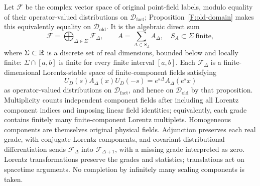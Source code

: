 \begin{assumption}
Let $\mathcal F$ be the complex vector space of original point-field
labels, modulo equality of their operator-valued distributions on
$\mathcal D_{\mathrm{fact}}$; Proposition~\ref{F:old-domain} makes this
equivalently equality on $\mathcal D_{\mathrm{old}}$. It is the algebraic direct sum
\[
 \mathcal F=\bigoplus_{\Delta\in\Sigma}\mathcal F_\Delta,
 \qquad
 A=\sum_{\Delta\in S_A}A_\Delta,
 \quad S_A\subset\Sigma\ \text{finite},
\]
where $\Sigma\subset\mathbb R$ is a discrete set of real dimensions, bounded
below and locally finite: $\Sigma\cap[a,b]$ is finite for every finite
interval $[a,b]$. Each $\mathcal F_\Delta$ is a finite-dimensional
Lorentz-stable space of finite-component fields satisfying
\[
 U_D(s)A_\Delta(x)U_D(-s)
       =e^{s\Delta}A_\Delta(e^s x)
\]
as operator-valued distributions on $\mathcal D_{\mathrm{fact}}$, and hence
on $\mathcal D_{\mathrm{old}}$ by that proposition.
Multiplicity counts independent component fields after including all
Lorentz component indices and imposing linear field identities;
equivalently, each grade contains finitely many finite-component Lorentz
multiplets. Homogeneous components are themselves original physical
fields. Adjunction preserves each real grade, with conjugate Lorentz
components, and covariant distributional differentiation sends
$\mathcal F_\Delta$ into $\mathcal F_{\Delta+1}$, with a missing grade
interpreted as zero. Lorentz transformations preserve the grades and
statistics; translations act on spacetime arguments. No completion by
infinitely many scaling components is taken.


\end{assumption}
